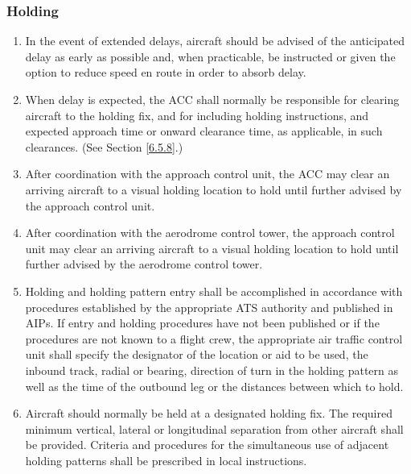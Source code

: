 \documentclass[../main.tex]{subfiles}
\begin{document}
    \subsubsection{Holding}

    \begin{enumerate}
        \item In the event of extended delays, aircraft should be advised of the anticipated delay as early as possible and, when practicable, be instructed or given the option to reduce speed en route in order to absorb delay.
        \item When delay is expected, the ACC shall normally be responsible for clearing aircraft to the holding fix, and for including holding instructions, and expected approach time or onward clearance time, as applicable, in such clearances. (See Section \ref{6.5.8}.)
        \item After coordination with the approach control unit, the ACC may clear an arriving aircraft to a visual holding location to hold until further advised by the approach control unit.
        \item After coordination with the aerodrome control tower, the approach control unit may clear an arriving aircraft to a visual holding location to hold until further advised by the aerodrome control tower.
        \item Holding and holding pattern entry shall be accomplished in accordance with procedures established by the appropriate ATS authority and published in AIPs. If entry and holding procedures have not been published or if the procedures are not known to a flight crew, the appropriate air traffic control unit shall specify the designator of the location or aid to be used, the inbound track, radial or bearing, direction of turn in the holding pattern as well as the time of the outbound leg or the distances between which to hold.
        \item Aircraft should normally be held at a designated holding fix. The required minimum vertical, lateral or longitudinal separation from other aircraft shall be provided. Criteria and procedures for the simultaneous use of adjacent holding patterns shall be prescribed in local instructions.



\end{enumerate}
\end{document}
